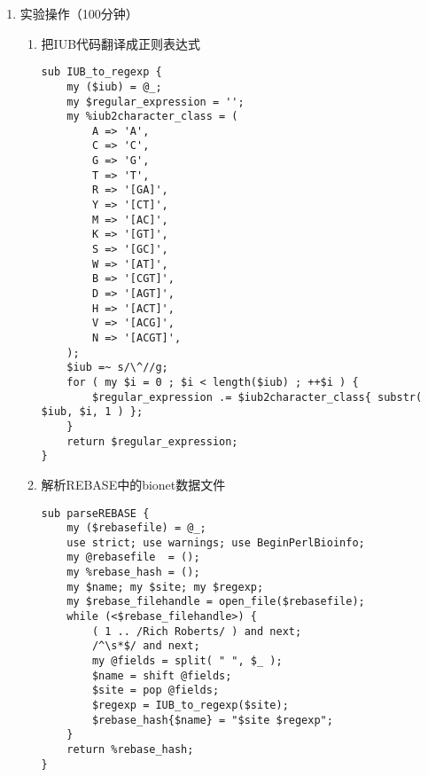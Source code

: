 \documentclass{TIJMUjiaoanSY}
\begin{document}
\firstTail

\newpage
\otherHeader

\begin{enumerate}
  \item 实验操作（100分钟）
    \begin{enumerate}
      \item 把IUB代码翻译成正则表达式
\begin{verbatim}
sub IUB_to_regexp {
    my ($iub) = @_;
    my $regular_expression = '';
    my %iub2character_class = (
        A => 'A',
        C => 'C',
        G => 'G',
        T => 'T',
        R => '[GA]',
        Y => '[CT]',
        M => '[AC]',
        K => '[GT]',
        S => '[GC]',
        W => '[AT]',
        B => '[CGT]',
        D => '[AGT]',
        H => '[ACT]',
        V => '[ACG]',
        N => '[ACGT]',
    );
    $iub =~ s/\^//g;
    for ( my $i = 0 ; $i < length($iub) ; ++$i ) {
        $regular_expression .= $iub2character_class{ substr( $iub, $i, 1 ) };
    }
    return $regular_expression;
}
\end{verbatim}
      \item 解析REBASE中的bionet数据文件
\begin{verbatim}
sub parseREBASE {
    my ($rebasefile) = @_;
    use strict; use warnings; use BeginPerlBioinfo;
    my @rebasefile  = ();
    my %rebase_hash = ();
    my $name; my $site; my $regexp;
    my $rebase_filehandle = open_file($rebasefile);
    while (<$rebase_filehandle>) {
        ( 1 .. /Rich Roberts/ ) and next;
        /^\s*$/ and next;
        my @fields = split( " ", $_ );
        $name = shift @fields;
        $site = pop @fields;
        $regexp = IUB_to_regexp($site);
        $rebase_hash{$name} = "$site $regexp";
    }
    return %rebase_hash;
}
\end{verbatim}

\otherTail
\newpage
\otherHeader


\end{enumerate}
\end{enumerate}
\end{document}
